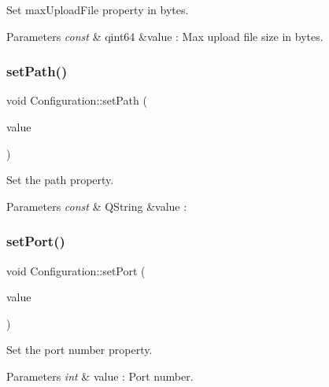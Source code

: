 Set max\+Upload\+File property in bytes. 


\begin{DoxyParams}{Parameters}
{\em const} & qint64 \&value \+: Max upload file size in bytes. \\
\hline
\end{DoxyParams}
\mbox{\label{class_configuration_ade67019de7f09f22093d920fc30152e5}} 
\subsubsection{\texorpdfstring{set\+Path()}{setPath()}}
{\footnotesize\ttfamily void Configuration\+::set\+Path (\begin{DoxyParamCaption}\item[{const Q\+String \&}]{value }\end{DoxyParamCaption})}



Set the path property. 


\begin{DoxyParams}{Parameters}
{\em const} & Q\+String \&value \+: \\
\hline
\end{DoxyParams}
\mbox{\label{class_configuration_aae5aafdfeb2a6e110ef8bad90a85be5e}} 
\subsubsection{\texorpdfstring{set\+Port()}{setPort()}}
{\footnotesize\ttfamily void Configuration\+::set\+Port (\begin{DoxyParamCaption}\item[{int}]{value }\end{DoxyParamCaption})}



Set the port number property. 


\begin{DoxyParams}{Parameters}
{\em int} & value \+: Port number. \\
\hline
\end{DoxyParams}
\mbox{\label{class_configuration_a306d88e7d7c2b8394844936b49be9013}} 
